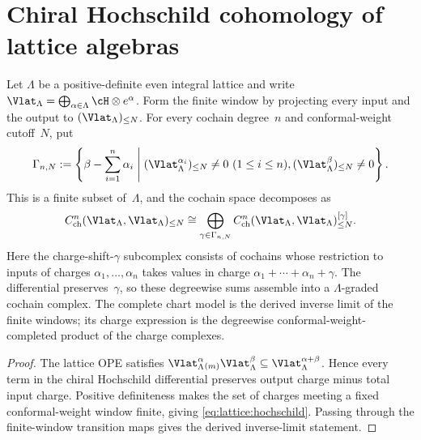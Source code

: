 \section{Chiral Hochschild cohomology of lattice algebras}
\label{sec:lattice:hochschild}

\begin{proposition}\label{thm:lattice:hochschild}
\label{prop:lattice-hochschild-charge-decomposition}
Let $\Lambda$ be a positive-definite even integral lattice and write
$\Vlat_\Lambda=\bigoplus_{\alpha\in\Lambda}\cH\otimes e^\alpha$.
Form the finite window by projecting every input and the output to
$(\Vlat_\Lambda)_{\leq N}$.  For every cochain degree~$n$ and
conformal-weight cutoff~$N$, put
\[
 \Gamma_{n,N}:=
 \left\{\beta-\sum_{i=1}^n\alpha_i\;\middle|\;
 (\Vlat_\Lambda^{\alpha_i})_{\leq N}\neq0\ (1\leq i\leq n),
 (\Vlat_\Lambda^\beta)_{\leq N}\neq0\right\}.
\]
This is a finite subset of~$\Lambda$, and the cochain space decomposes
as
\begin{equation}\label{eq:lattice:hochschild}
C^n_{\mathrm{ch}}(\Vlat_\Lambda,\Vlat_\Lambda)_{\leq N}
\cong
\bigoplus_{\gamma\in\Gamma_{n,N}}
C^n_{\mathrm{ch}}
(\Vlat_\Lambda,\Vlat_\Lambda)^{[\gamma]}_{\leq N}.
\end{equation}
Here the charge-shift-$\gamma$ subcomplex consists of cochains whose
restriction to inputs of charges $\alpha_1,\ldots,\alpha_n$ takes
values in charge
$\alpha_1+\cdots+\alpha_n+\gamma$.
The differential preserves~$\gamma$, so these degreewise sums assemble
into a $\Lambda$-graded cochain complex.  The complete chart model is
the derived inverse limit of the finite windows; its charge expression
is the degreewise conformal-weight-completed product of the charge
complexes.
\end{proposition}

\begin{proof}
The lattice OPE satisfies
$\Vlat_\Lambda^\alpha{}_{(m)}\Vlat_\Lambda^\beta
\subseteq\Vlat_\Lambda^{\alpha+\beta}$.  Hence every term in the
chiral Hochschild differential preserves output charge minus total
input charge.  Positive definiteness makes the set of charges meeting
a fixed conformal-weight window finite, giving
\eqref{eq:lattice:hochschild}.  Passing through the finite-window
transition maps gives the derived inverse-limit statement.
\end{proof}

